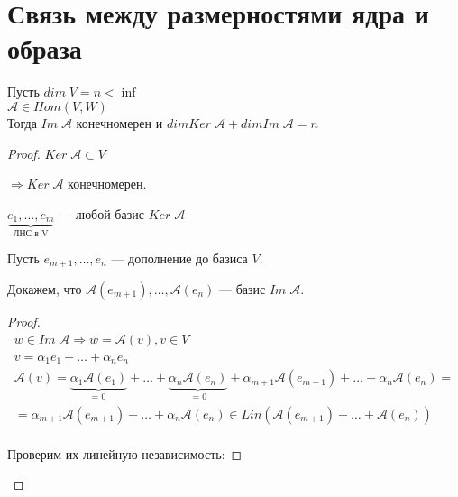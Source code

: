 \section{Связь между размерностями ядра и образа}

\begin{theorem-non}

    Пусть $dim \; V = n < \inf$ \\
    $\mathcal{A} \in Hom(V, W)$ \\
    Тогда $Im \; \mathcal{A}$ конечномерен и
    $dim Ker \; \mathcal{A} + dim Im \; \mathcal{A} = n$

    \begin{proof}
        
        $Ker \; \mathcal{A} \subset V$

        $\Longrightarrow Ker \; \mathcal{A}$ конечномерен. 
        
        $\underbrace{e_1, \dots, e_m}_{\text{ЛНС в V}}$ --- любой базис $Ker \; \mathcal{A}$

        Пусть $e_{m + 1}, \dots, e_n$ --- дополнение до базиса $V$.

        Докажем, что $\mathcal{A}(e_{m+1}), \dots, \mathcal{A}(e_n)$ ---
        базис $Im \; \mathcal{A}$.

        \begin{proof}
            \begin{gather*}
                w \in Im \; \mathcal{A} \Longrightarrow w = \mathcal{A}(v), v \in V \\    
                v = \alpha_1e_1 + \dots + \alpha_ne_n \\
                \mathcal{A}(v) =
                \underbrace{\alpha_1\mathcal{A}(e_1)}_{\text{ = 0 }} +
                \dots +
                \underbrace{\alpha_n\mathcal{A}(e_n)}_{\text{ = 0}} +
                \alpha_{m+1}\mathcal{A}(e_{m+1}) + \dots + \alpha_n\mathcal{A}(e_n) = \\
                = \alpha_{m+1}\mathcal{A}(e_{m+1}) + \dots + \alpha_n\mathcal{A}(e_n) \in Lin(\mathcal{A}(e_{m+1}) + \dots + \mathcal{A}(e_n)) \\ 
            \end{gather*}

            Проверим их линейную независимость:


\end{proof}
\end{proof}
\end{theorem-non}
